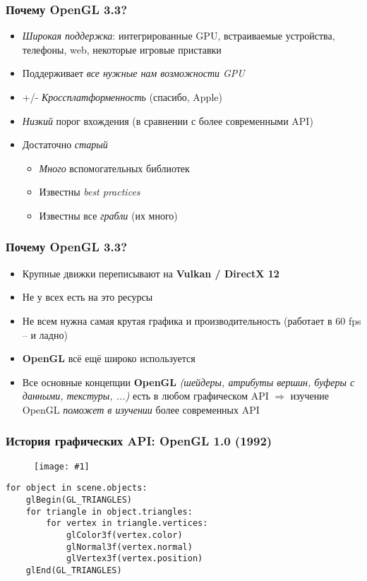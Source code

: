 \documentclass[10pt]{beamer}
\newcommand{\slideimage}[1]{
  \begin{figure}
    \begin{adjustbox}{width=\textwidth, totalheight=\textheight-2\baselineskip-2\baselineskip,keepaspectratio}
      \texttt{[image: \#1]}
    \end{adjustbox}
  \end{figure}
}
\begin{document}
\begin{frame}
\frametitle{Почему OpenGL 3.3?}
\pause
\begin{itemize}
\item \textit{Широкая поддержка}: интегрированные GPU, встраиваемые устройства, телефоны, web, некоторые игровые приставки
\pause
\item Поддерживает \textit{все нужные нам возможности GPU}
\pause
\item +/- \textit{Кроссплатформенность} \pause (спасибо, Apple)
\pause
\item \textit{Низкий} порог вхождения (в сравнении с более современными API)
\pause
\item Достаточно \textit{старый}
\begin{itemize}
\item \textit{Много} вспомогательных библиотек
\item Известны \textit{best practices}
\item Известны все \textit{грабли} \pause (их много)
\end{itemize}
\end{itemize}
\end{frame}

\begin{frame}
\frametitle{Почему OpenGL 3.3?}
\pause
\begin{itemize}
\item Крупные движки переписывают на \textbf{Vulkan / DirectX 12}
\pause
\item Не у всех есть на это ресурсы
\pause
\item Не всем нужна самая крутая графика и производительность (работает в 60 fps -- и ладно)
\pause
\item \textbf{OpenGL} всё ещё широко используется
\pause
\item Все основные концепции \textbf{OpenGL} \textit{(шейдеры, атрибуты вершин, буферы с данными, текстуры, ...)} есть в любом графическом API $\Rightarrow$ изучение OpenGL \textit{поможет в изучении} более современных API
\end{itemize}
\end{frame}

\begin{frame}[fragile]
\frametitle{История графических API: OpenGL 1.0 (1992)}
\slideimage{opengl.png}
\begin{verbatim}
for object in scene.objects:
    glBegin(GL_TRIANGLES)
    for triangle in object.triangles:
        for vertex in triangle.vertices:
            glColor3f(vertex.color)
            glNormal3f(vertex.normal)
            glVertex3f(vertex.position)
    glEnd(GL_TRIANGLES)
\end{verbatim}
\end{frame}
\end{document}

